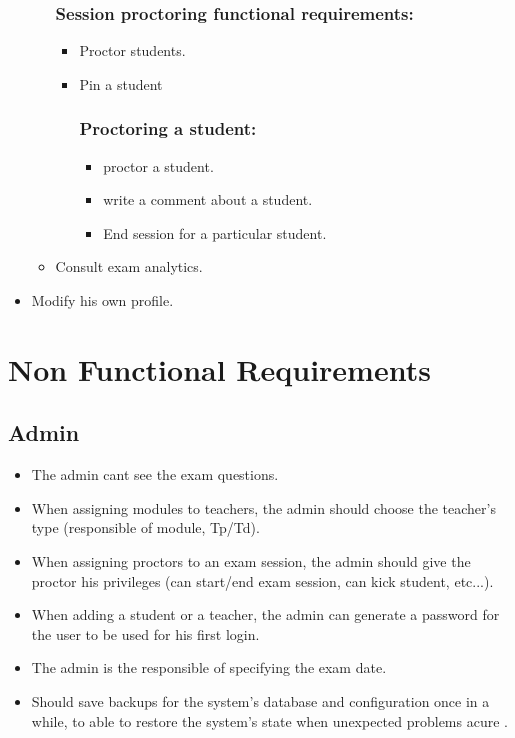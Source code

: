 \documentclass[]{uc2pfecaneva}
\begin{document}
\begin{itemize}
\begin{itemize}
            \subsubsection{Session proctoring functional requirements:}
            \begin{itemize}
                \item Proctor students.
                \item Pin a student
                \subsubsection{Proctoring a student:}
                \begin{itemize}
                    \item proctor a student.
                    \item write a comment about a student.
                    \item End session for a particular student.
                \end{itemize}
            \end{itemize}
            \item Consult exam analytics.
        \end{itemize}
        \item Modify his own profile.
    \end{itemize}


    \raggedright\section{Non Functional Requirements}
    \raggedright\subsection{Admin}
    \begin{itemize}
        \item The admin cant see the exam questions.
        \item When assigning modules to teachers, the admin should choose the teacher’s type (responsible of module, Tp/Td).
        \item When assigning proctors to an exam session, the admin should give the proctor his privileges (can start/end exam session, can kick student, etc...).
        \item When adding a student or a teacher, the admin can generate a password for the user to be used for his first login.
        \item The admin is the responsible of specifying the exam date.
        \item Should save backups for the system’s database and configuration once in a while, to able to restore the system’s state when  unexpected problems acure .

    \end{itemize}
\end{document}
